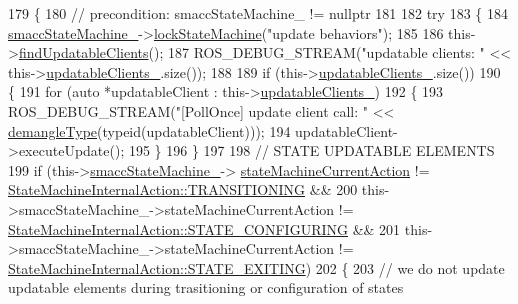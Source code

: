 \begin{DoxyCode}
179     \{
180         \textcolor{comment}{// precondition: smaccStateMachine\_ != nullptr}
181 
182         \textcolor{keywordflow}{try}
183         \{
184             \hyperlink{classsmacc_1_1SignalDetector_a46025de6ac7b5980e22144f9703236a4}{smaccStateMachine\_}->\hyperlink{classsmacc_1_1ISmaccStateMachine_a5c8d4c9a4b11c7950266a00e48080ce3}{lockStateMachine}(\textcolor{stringliteral}{"update behaviors"});
185 
186             this->\hyperlink{classsmacc_1_1SignalDetector_a47ec2df560e2e33758ce3975bece9385}{findUpdatableClients}();
187             ROS\_DEBUG\_STREAM(\textcolor{stringliteral}{"updatable clients: "} << this->\hyperlink{classsmacc_1_1SignalDetector_a01a457b4ec935473d6426efb7b87e683}{updatableClients\_}.size());
188 
189             \textcolor{keywordflow}{if} (this->\hyperlink{classsmacc_1_1SignalDetector_a01a457b4ec935473d6426efb7b87e683}{updatableClients\_}.size())
190             \{
191                 \textcolor{keywordflow}{for} (\textcolor{keyword}{auto} *updatableClient : this->\hyperlink{classsmacc_1_1SignalDetector_a01a457b4ec935473d6426efb7b87e683}{updatableClients\_})
192                 \{
193                     ROS\_DEBUG\_STREAM(\textcolor{stringliteral}{"[PollOnce] update client call:  "} << 
      \hyperlink{namespacesmacc_1_1introspection_a670e39ccea29952859df4e2d0e45077b}{demangleType}(\textcolor{keyword}{typeid}(updatableClient)));
194                     updatableClient->executeUpdate();
195                 \}
196             \}
197 
198             \textcolor{comment}{// STATE UPDATABLE ELEMENTS}
199             \textcolor{keywordflow}{if} (this->\hyperlink{classsmacc_1_1SignalDetector_a46025de6ac7b5980e22144f9703236a4}{smaccStateMachine\_}->
      \hyperlink{classsmacc_1_1ISmaccStateMachine_a654a98ba86c4c1013ac3c371f293d950}{stateMachineCurrentAction} != 
      \hyperlink{namespacesmacc_a0889aff43c93fe5285109819d2898144a5e174e130ee1847f37541ba5786207a3}{StateMachineInternalAction::TRANSITIONING} &&
200                 this->smaccStateMachine\_->stateMachineCurrentAction != 
      \hyperlink{namespacesmacc_a0889aff43c93fe5285109819d2898144a32406d3560b9f36b3e6e3b84454e1be5}{StateMachineInternalAction::STATE\_CONFIGURING} &&
201                 this->smaccStateMachine\_->stateMachineCurrentAction != 
      \hyperlink{namespacesmacc_a0889aff43c93fe5285109819d2898144a22bd5bb7935dd66f181d92efc273951e}{StateMachineInternalAction::STATE\_EXITING})
202             \{
203                 \textcolor{comment}{// we do not update updatable elements during trasitioning or configuration of states}

\end{DoxyCode}
